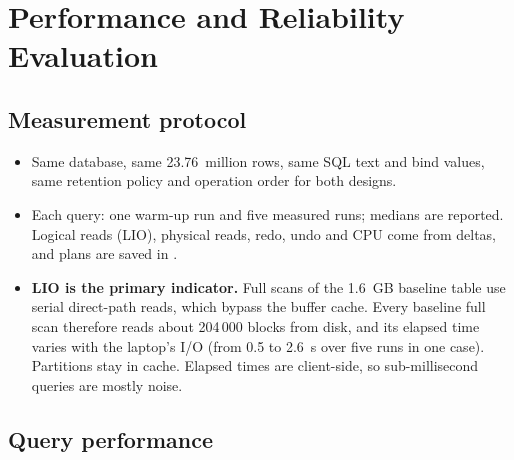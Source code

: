 \chapter{Performance and Reliability Evaluation}\label{ch:performance}

\section{Measurement protocol}

\begin{itemize}
  \item Same database, same 23.76~million rows, same SQL text and bind values, same retention
        policy and operation order for both designs.
  \item Each query: one warm-up run and five measured runs; medians are reported. Logical reads
        (LIO), physical reads, redo, undo and CPU come from  deltas, and plans
        are saved in .
  \item \textbf{LIO is the primary indicator.} Full scans of the 1.6~GB baseline table use
        serial direct-path reads, which bypass the buffer cache. Every baseline full scan
        therefore reads about 204\,000 blocks from disk, and its elapsed time varies with the
        laptop's I/O (from 0.5 to 2.6~s over five runs in one case). Partitions stay in cache.
        Elapsed times are client-side, so sub-millisecond queries are mostly noise.
\end{itemize}

\section{Query performance}

